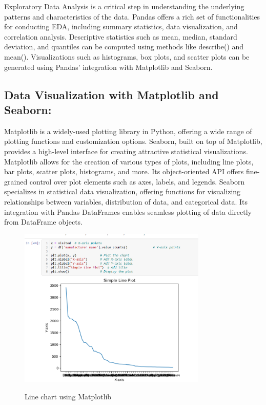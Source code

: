 \documentclass{article}
\begin{document}
{Exploratory Data Analysis is a critical step in understanding the underlying patterns and characteristics of the data. Pandas offers a rich set of functionalities for conducting EDA, including summary statistics, data visualization, and correlation analysis.
Descriptive statistics such as mean, median, standard deviation, and quantiles can be computed using methods like describe() and mean(). Visualizations such as histograms, box plots, and scatter plots can be generated using Pandas' integration with Matplotlib and Seaborn.

\subsection{Data Visualization with Matplotlib and Seaborn:}

Matplotlib is a widely-used plotting library in Python, offering a wide range of plotting functions and customization options. Seaborn, built on top of Matplotlib, provides a high-level interface for creating attractive statistical visualizations.
Matplotlib allows for the creation of various types of plots, including line plots, bar plots, scatter plots, histograms, and more. Its object-oriented API offers fine-grained control over plot elements such as axes, labels, and legends.
Seaborn specializes in statistical data visualization, offering functions for visualizing relationships between variables, distribution of data, and categorical data. Its integration with Pandas DataFrames enables seamless plotting of data directly from DataFrame objects.

\begin{figure}[htbp]
  \centering
  \vspace{0.3cm}
  \includegraphics[width=0.8\textwidth]{Figures/Python/pythn analysis using matplotlib.png}\\
  \caption{Line chart using Matplotlib}
  \vspace{0.3cm}
\end{figure}

}
\end{document}
